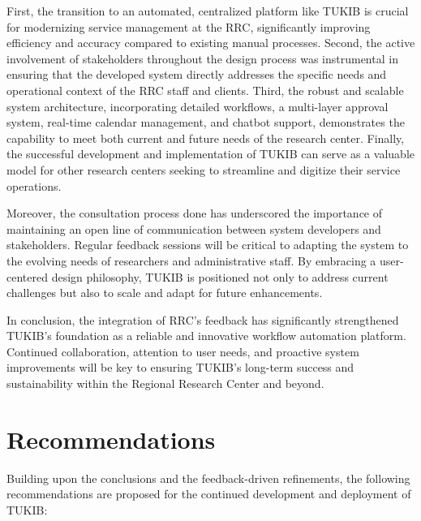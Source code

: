 First, the transition to an automated, centralized platform like TUKIB is crucial for modernizing service management at the RRC, significantly improving efficiency and accuracy compared to existing manual processes. Second, the active involvement of stakeholders throughout the design process was instrumental in ensuring that the developed system directly addresses the specific needs and operational context of the RRC staff and clients. Third, the robust and scalable system architecture, incorporating detailed workflows, a multi-layer approval system, real-time calendar management, and chatbot support, demonstrates the capability to meet both current and future needs of the research center. Finally, the successful development and implementation of TUKIB can serve as a valuable model for other research centers seeking to streamline and digitize their service operations.

Moreover, the consultation process done has underscored the importance of maintaining an open line of communication between system developers and stakeholders. Regular feedback sessions will be critical to adapting the system to the evolving needs of researchers and administrative staff. By embracing a user-centered design philosophy, TUKIB is positioned not only to address current challenges but also to scale and adapt for future enhancements.

In conclusion, the integration of RRC’s feedback has significantly strengthened TUKIB’s foundation as a reliable and innovative workflow automation platform. Continued collaboration, attention to user needs, and proactive system improvements will be key to ensuring TUKIB’s long-term success and sustainability within the Regional Research Center and beyond.

\section{Recommendations}
Building upon the conclusions and the feedback-driven refinements, the following recommendations are proposed for the continued development and deployment of TUKIB:



